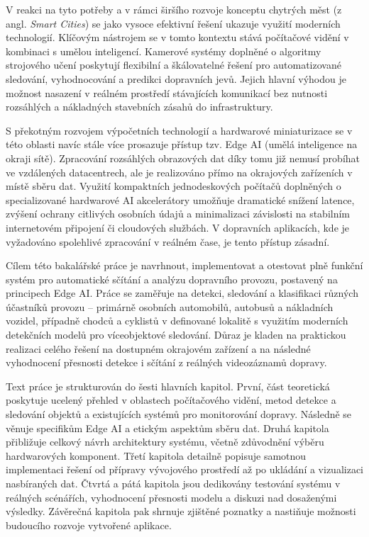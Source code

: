 \documentclass[male,czech,api_bc]{kitheses}
\begin{document}
V reakci na tyto potřeby a v rámci širšího rozvoje konceptu chytrých měst (z angl. \textit{Smart Cities}) se jako vysoce efektivní řešení ukazuje využití moderních technologií. Klíčovým nástrojem se v tomto kontextu stává počítačové vidění v kombinaci s umělou inteligencí. Kamerové systémy doplněné o algoritmy strojového učení poskytují flexibilní a škálovatelné řešení pro automatizované sledování, vyhodnocování a predikci dopravních jevů. Jejich hlavní výhodou je možnost nasazení v reálném prostředí stávajících komunikací bez nutnosti rozsáhlých a nákladných stavebních zásahů do infrastruktury.

S překotným rozvojem výpočetních technologií a hardwarové miniaturizace se v této oblasti navíc stále více prosazuje přístup tzv. \acs{Edge AI} (umělá inteligence na okraji sítě). Zpracování rozsáhlých obrazových dat díky tomu již nemusí probíhat ve vzdálených datacentrech, ale je realizováno přímo na okrajových zařízeních v místě sběru dat. Využití kompaktních jednodeskových počítačů doplněných o specializované hardwarové AI akcelerátory umožňuje dramatické snížení latence, zvýšení ochrany citlivých osobních údajů a minimalizaci závislosti na stabilním internetovém připojení či cloudových službách. V dopravních aplikacích, kde je vyžadováno spolehlivé zpracování v reálném čase, je tento přístup zásadní.

Cílem této bakalářské práce je navrhnout, implementovat a otestovat plně funkční systém pro automatické sčítání a analýzu dopravního provozu, postavený na principech \acs{Edge AI}. Práce se zaměřuje na detekci, sledování a klasifikaci různých účastníků provozu – primárně osobních automobilů, autobusů a nákladních vozidel, případně chodců a cyklistů v definované lokalitě s využitím moderních detekčních modelů pro víceobjektové sledování. Důraz je kladen na praktickou realizaci celého řešení na dostupném okrajovém zařízení a na následné vyhodnocení přesnosti detekce i sčítání z reálných videozáznamů dopravy.

Text práce je strukturován do šesti hlavních kapitol. První, část teoretická poskytuje ucelený přehled v oblastech počítačového vidění, metod detekce a sledování objektů a existujících systémů pro monitorování dopravy. Následně se věnuje specifikům \acs{Edge AI} a etickým aspektům sběru dat. Druhá kapitola přibližuje celkový návrh architektury systému, včetně zdůvodnění výběru hardwarových komponent. Třetí kapitola detailně popisuje samotnou implementaci řešení od přípravy vývojového prostředí až po ukládání a vizualizaci nasbíraných dat. Čtvrtá a pátá kapitola jsou dedikovány testování systému v reálných scénářích, vyhodnocení přesnosti modelu a diskuzi nad dosaženými výsledky. Závěrečná kapitola pak shrnuje zjištěné poznatky a nastiňuje možnosti budoucího rozvoje vytvořené aplikace.
\end{document}
